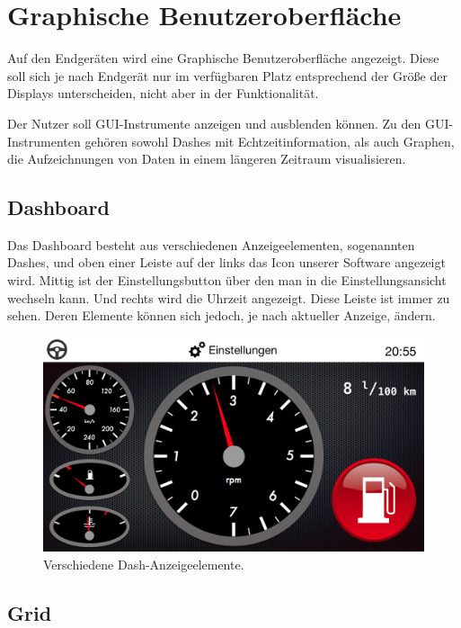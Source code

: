 \documentclass[pflichtenheft.tex]{subfiles}
\begin{document}
\chapter{Graphische Benutzeroberfläche}
Auf den Endgeräten wird eine Graphische Benutzeroberfläche angezeigt. Diese soll sich je nach Endgerät nur im verfügbaren Platz entsprechend der Größe der Displays unterscheiden, nicht aber in der Funktionalität.

Der Nutzer soll GUI-Instrumente anzeigen und ausblenden können. Zu den GUI-Instrumenten gehören sowohl Dashes mit Echtzeitinformation, als auch Graphen, die Aufzeichnungen von Daten in einem längeren Zeitraum visualisieren.


\section{Dashboard}

Das Dashboard besteht aus verschiedenen Anzeigeelementen, sogenannten Dashes, und oben einer Leiste auf der links das Icon unserer Software angezeigt wird. Mittig ist der Einstellungsbutton über den man in die Einstellungsansicht wechseln kann. Und rechts wird die Uhrzeit angezeigt. Diese Leiste ist immer zu sehen. Deren Elemente können sich jedoch, je nach aktueller Anzeige, ändern.

\begin{figure}[H]
  	\begin{center}
 		\includegraphics[width=\textwidth]{Images/GUI-Dashboard.png}
  		\caption{Verschiedene Dash-Anzeigeelemente.}
  	\end{center}
\end{figure}

\clearpage
\section{Grid}
\end{document}
